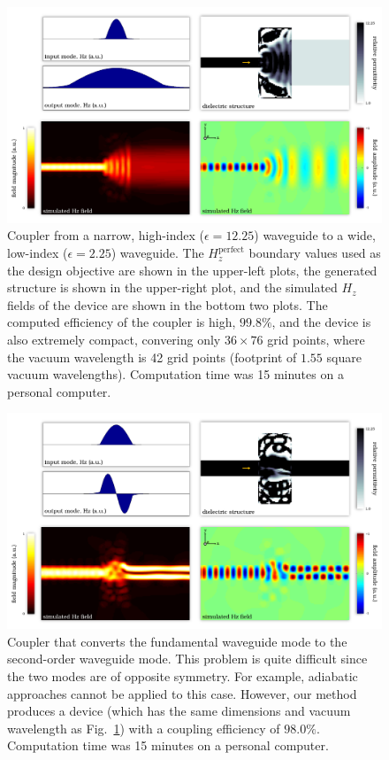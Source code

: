 \begin{figure}[htb]
    \centering
    \includegraphics[width=\textwidth]{p3/1} 
    \caption{Coupler from a narrow, high-index ($\epsilon=12.25$) waveguide to
            a wide, low-index ($\epsilon=2.25$) waveguide. 
        The $H_z^\text{perfect}$ boundary values used as 
            the design objective are shown in the upper-left plots, 
            the generated structure is shown in the upper-right plot, and
            the simulated $H_z$ fields of the device are shown 
            in the bottom two plots.
        The computed efficiency of the coupler is high, $99.8\%$, and
            the device is also extremely compact, 
            convering only $36 \times 76$ grid points,
            where the vacuum wavelength is 42 grid points
            (footprint of $1.55$ square vacuum wavelengths).
        Computation time was 15 minutes on a personal computer.}
    \label{fig:fiber}
\end{figure}
\begin{figure}[htb]
    \centering
    \includegraphics[width=\textwidth]{p3/2} 
    \caption{Coupler that converts the fundamental waveguide mode to the
            second-order waveguide mode.
        This problem is quite difficult since the two modes are of 
            opposite symmetry.
        For example, adiabatic approaches cannot be applied to this case.
        However, our method produces a device 
            (which has the same dimensions and vacuum wavelength as 
            Fig.~\ref{fig:fiber})  
            with a coupling efficiency of $98.0\%$. 
        Computation time was 15 minutes on a personal computer.
        }
    \label{fig:mode}
\end{figure}

